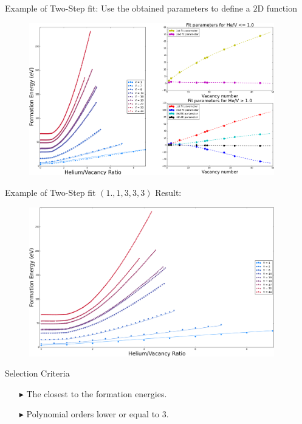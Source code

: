 \documentclass[10pt]{beamer}
\begin{document}
\begin{frame}{Example of Two-Step fit:}
	Use the obtained parameters to define a $2$D function
	\begin{figure}
        \includegraphics[width=0.95\textwidth]{fit1DS5}
    \end{figure}
\end{frame}

\begin{frame}{Example of Two-Step fit $(1., 1, 3, 3, 3)$}
	Result:
	\begin{figure}
        \includegraphics[width=0.95\textwidth]{formationFit1D_13331}
    \end{figure}
\end{frame}

\begin{frame}{Selection Criteria}
	\large
    \begin{itemize}
      	\item[$\blacktriangleright$] The closest to the formation energies.
      	\newline
      	\item[$\blacktriangleright$] Polynomial orders lower or equal to $3$.
    \end{itemize}
\end{frame}
\end{document}
